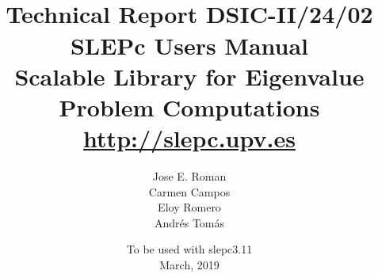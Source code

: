 \documentclass[titlepage,10pt,a4paper]{book}
\newcommand{\slepcversion}{3.11}
\newcommand{\slepchome}{http://slepc.upv.es}
\newcommand{\packnoi}[1]{{\sc #1}\xspace}
\newcommand{\slepc}{\texorpdfstring{\packnoi{slep\rm c}}{{SLEPc}}}
\begin{document}
\title{
 	\vspace*{-1cm}
	\\[2cm]
	\normalsize Technical Report DSIC-II/24/02
	\\[2cm]
	\vspace*{6mm}
	{\Large\bf\sffamily
	SLEPc Users Manual\\[2mm]}
	{\large\bf\sffamily
	Scalable Library for Eigenvalue Problem Computations}\\[2mm]
	\vspace*{6mm}
	\vspace*{6mm}
	\url{\slepchome}
	\\[6mm]
}

\author{
  Jose E. Roman\\
  Carmen Campos\\
  Eloy Romero\\
  Andr\'es Tom\'as\\[3mm]
}

\date{
	To be used with \slepc \slepcversion\\
	March, 2019
}

\hypersetup{pageanchor=false}
\begin{titlepage}
\maketitle
\end{titlepage}

\setlength{\textheight}{18cm}
\setlength{\oddsidemargin}{0.6cm}
\setlength{\evensidemargin}{0.6cm}
\setlength{\footskip}{2cm}
\setlength{\voffset}{1.3cm}
\end{document}
